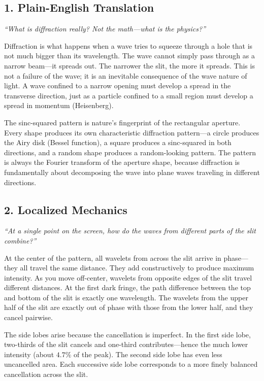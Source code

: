 \documentclass[11pt,openright]{book}
\begin{document}
\subsection*{1. Plain-English Translation}
\textit{``What is diffraction really? Not the math---what is the physics?''}

Diffraction is what happens when a wave tries to squeeze through a hole that is not much bigger than its wavelength. The wave cannot simply pass through as a narrow beam---it spreads out. The narrower the slit, the more it spreads. This is not a failure of the wave; it is an inevitable consequence of the wave nature of light. A wave confined to a narrow opening must develop a spread in the transverse direction, just as a particle confined to a small region must develop a spread in momentum (Heisenberg).

The sinc-squared pattern is nature's fingerprint of the rectangular aperture. Every shape produces its own characteristic diffraction pattern---a circle produces the Airy disk (Bessel function), a square produces a sinc-squared in both directions, and a random shape produces a random-looking pattern. The pattern is always the Fourier transform of the aperture shape, because diffraction is fundamentally about decomposing the wave into plane waves traveling in different directions.

\subsection*{2. Localized Mechanics}
\textit{``At a single point on the screen, how do the waves from different parts of the slit combine?''}

At the center of the pattern, all wavelets from across the slit arrive in phase---they all travel the same distance. They add constructively to produce maximum intensity. As you move off-center, wavelets from opposite edges of the slit travel different distances. At the first dark fringe, the path difference between the top and bottom of the slit is exactly one wavelength. The wavelets from the upper half of the slit are exactly out of phase with those from the lower half, and they cancel pairwise.

The side lobes arise because the cancellation is imperfect. In the first side lobe, two-thirds of the slit cancels and one-third contributes---hence the much lower intensity (about $4.7\%$ of the peak). The second side lobe has even less uncancelled area. Each successive side lobe corresponds to a more finely balanced cancellation across the slit.
\end{document}

